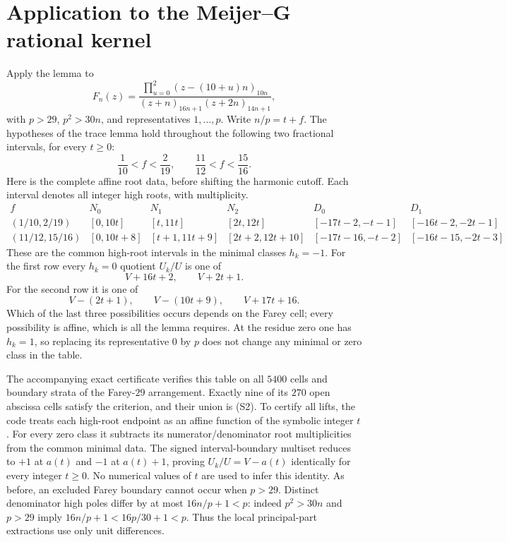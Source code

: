 \documentclass[11pt]{article}
\begin{document}
\section{Application to the Meijer--G rational kernel}
Apply the lemma to
\[
 F_n(z)=\frac{\prod_{u=0}^2(z-(10+u)n)_{10n}}
                  {(z+n)_{16n+1}(z+2n)_{14n+1}},
\]
with $p>29$, $p^2>30n$, and representatives $1,\ldots,p$.
Write $n/p=t+f$.  The hypotheses of the trace lemma hold throughout the
following two fractional intervals, for every $t\ge0$:
\[
              \frac1{10}<f<\frac2{19},\qquad
              \frac{11}{12}<f<\frac{15}{16}.           \tag{S2}
\]
Here is the complete affine root data, before shifting the harmonic
cutoff.  Each interval denotes all integer high roots, with multiplicity.
\begingroup\small\setlength{\arraycolsep}{3.5pt}
\[
\begin{array}{c|ccc|cc}
 f&N_0&N_1&N_2&D_0&D_1\\\hline
 (1/10,2/19)
 &[0,10t]&[t,11t]&[2t,12t]
 &[-17t-2,-t-1]&[-16t-2,-2t-1]\\
 (11/12,15/16)
 &[0,10t+8]&[t+1,11t+9]&[2t+2,12t+10]
 &[-17t-16,-t-2]&[-16t-15,-2t-3]
\end{array}
\]
\endgroup
These are the common high-root intervals in the minimal classes
$h_k=-1$.  For the first row every $h_k=0$ quotient $U_k/U$ is one of
\[
                    V+16t+2,\qquad V+2t+1.
\]
For the second row it is one of
\[
                    V-(2t+1),\qquad V-(10t+9),\qquad V+17t+16.
\]
Which of the last three possibilities occurs depends on the Farey cell;
every possibility is affine, which is all the lemma requires.
At the residue zero one has $h_k=1$, so replacing its representative $0$
by $p$ does not change any minimal or zero class in the table.

The accompanying exact certificate verifies this table on all $5400$
cells and boundary strata of the Farey-$29$ arrangement.  Exactly nine
of its $270$ open abscissa cells satisfy the criterion, and their union is
(S2).  To certify all lifts, the code treats each high-root endpoint as
an affine function of the symbolic integer $t$.  For every zero class it
subtracts its numerator/denominator root multiplicities from the common
minimal data.  The signed interval-boundary multiset reduces to $+1$ at
$a(t)$ and $-1$ at $a(t)+1$, proving $U_k/U=V-a(t)$ identically for every
integer $t\ge0$.  No numerical values of $t$ are used to infer this
identity.  As before, an excluded Farey boundary cannot occur when
$p>29$.  Distinct denominator high poles differ by at most $16n/p+1<p$:
indeed $p^2>30n$ and $p>29$ imply
$16n/p+1<16p/30+1<p$.  Thus the local principal-part
extractions use only unit differences.
\end{document}
